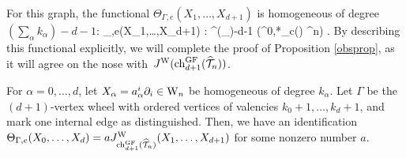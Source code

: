 %
%
%
For this graph, the functional $\Theta_{\Gamma,e}(X_1,\ldots,X_{d+1})$ is homogeneous of degree $\left(\sum_\alpha {k_\alpha}\right)-d-1$:
\ben
\Theta_{\Gamma,e}(X_1,\ldots,X_{d+1}) : \Sym^{\left(\sum_\right)-d-1} (\Omega^{0,*}_c(\CC) \tensor \CC^n) \to \CC .
\een
By describing this functional explicitly, 
we will complete the proof of Proposition \ref{obsprop},
as it will agree on the nose with~$J^{\rm W}({\rm ch}_{d+1}^{{\rm GF}}(\widehat{\mathcal T}_n))$.

%
%

\begin{lem}
For $\alpha=0,\ldots,d$, let $X_\alpha = a^i_\alpha \partial_i \in {{\rm W}_n}$ be homogeneous of degree $k_\alpha$. 
Let $\Gamma$ be the $(d+1)$-vertex wheel with ordered vertices of valencies $k_0+1, \ldots, k_{d} + 1$, and mark one internal edge as distinguished.
Then, we have an identification $\Theta_{\Gamma,e}(X_0,\ldots,X_{d}) = a J^{\rm W}_{{\rm ch}_{d+1}^{\rm GF} (\widehat{\mathcal T}_n)}(X_1,\ldots,X_{d+1})$ for some nonzero number $a$. 
\end{lem}
 
